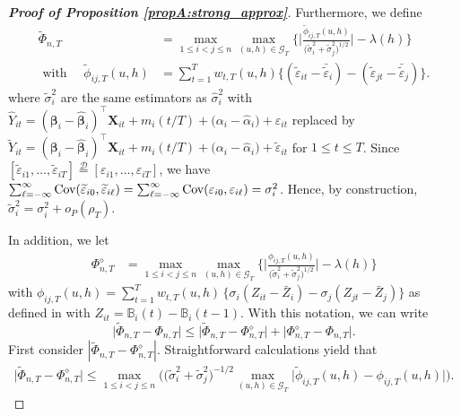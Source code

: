 \documentclass[a4paper,12pt]{article}
\makeatletter
\renewcommand{\eqref}[1]{\tagform@{\ref{#1}}}
\makeatother
\begin{document}
\begin{proof}[\textnormal{\textbf{Proof of Proposition \ref{propA:strong_approx}}}]
Furthermore, we define 
\begin{align*}
\widetilde{\Phi}_{n,T} &= \max_{1 \le i < j \le n}\max_{(u,h) \in \mathcal{G}_T} \Bigg\{ \bigg|\frac{\widetilde{\phi}_{ij, T}(u,h)}{\big(\widetilde{\sigma}_i^2 + \widetilde{\sigma}_j^2 \big)^{1/2}} \bigg| - \lambda(h)\Bigg\}\\
\text{ with }\quad \widetilde{\phi}_{ij, T}(u,h) &= \sum\nolimits_{t=1}^T w_{t,T}(u,h) \big\{ (\widetilde{\varepsilon}_{it} - \bar{\widetilde{\varepsilon}}_i)  - (\widetilde{\varepsilon}_{jt} - \bar{\widetilde{\varepsilon}}_j)\big\}.
\end{align*}
where $\widetilde{\sigma}^2_i$ are the same estimators as $\widehat{\sigma}^2_i$ with $\widehat{Y}_{it} = (\bm{\beta}_i - \widehat{\bm{\beta}}_i)^\top \mathbf{X}_{it} + m_i ( t/T) + \big( \alpha_i - \widehat{\alpha}_i \big) + \varepsilon_{it}$
replaced by $\widetilde{Y}_{it} = (\bm{\beta}_i - \widehat{\bm{\beta}}_i)^\top \mathbf{X}_{it} + m_i(t/T) + \big( \alpha_i - \widehat{\alpha}_i \big) + \widetilde{\varepsilon}_{it}$  for $1 \le t \le T$. Since $[\widetilde{\varepsilon}_{i1},\ldots,\widetilde{\varepsilon}_{iT}] \stackrel{\mathcal{D}}{=} [\varepsilon_{i1},\ldots,\varepsilon_{iT}]$, we have $\sum\nolimits_{\ell=-\infty}^{\infty} \textnormal{Cov}(\widetilde{\varepsilon}_{i0}, \widetilde{\varepsilon}_{i\ell})  = \sum\nolimits_{\ell=-\infty}^{\infty} \textnormal{Cov}(\varepsilon_{i0}, \varepsilon_{i\ell})= \sigma_i^2$. Hence, by construction, $\widetilde{\sigma}_i^2 = \sigma_i^2 + o_P(\rho_T)$.

In addition, we let
\begin{align*}
\Phi_{n, T}^{\diamond} & = \max_{1\leq i< j \leq n}\max_{(u,h) \in \mathcal{G}_T} \bigg\{ \bigg|\frac{\phi_{ij, T}(u,h)}{\big(\widetilde{\sigma}_i^2 + \widetilde{\sigma}_j^2 \big)^{1/2}}\bigg| - \lambda(h) \bigg\} 
\end{align*}
with $\phi_{ij,T}(u,h) = \sum\nolimits_{t=1}^T w_{t,T}(u,h) \, \big\{ \sigma_i (Z_{it} - \bar{Z}_i) - \sigma_j (Z_{jt} - \bar{Z}_j) \big\}
$ as defined in \eqref{eq:phi_ij} with $Z_{it} = \mathbb{B}_i(t) - \mathbb{B}_i(t-1)$. With this notation, we can write 
\begin{equation}\label{eq-strongapprox-bound1}
\big| \widetilde{\Phi}_{n, T} - \Phi_{n, T} \big| \le \big| \widetilde{\Phi}_{n, T} - \Phi_{n, T}^{\diamond} \big| + \big| \Phi_{n, T}^{\diamond} - \Phi_{n, T} \big|. 
\end{equation}
First consider $|\widetilde{\Phi}_{n, T} - \Phi_{n, T}^{\diamond}|$. Straightforward calculations yield that 
\begin{align}\label{eqA:strong_approx:bound2}
\big| \widetilde{\Phi}_{n, T} - \Phi_{n, T}^{\diamond} \big| \le  \max_{1\le i < j \le n} \Big(\big(\widetilde{\sigma}_i^2 + \widetilde{\sigma}_j^2 \big)^{-1/2} \max_{(u,h) \in \mathcal{G}_T} \big| \widetilde{\phi}_{ij, T}(u,h) - \phi_{ij, T}(u,h) \big|\Big).
\end{align}


\end{proof}
\end{document}
